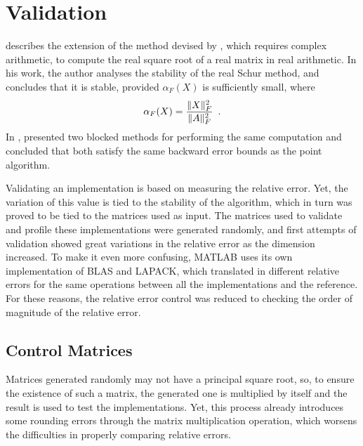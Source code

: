 \documentclass[../thesis]{subfiles}
\begin{document}
	\section{Validation}
	 describes the extension of the method devised by \citeauthor{bjorck:hammarling:1983}, which requires complex arithmetic, to compute the real square root of a real matrix in real arithmetic. In his work, the author analyses the stability of the real Schur method, and concludes that it is stable, provided $\alpha_F(X)$ is sufficiently small, where $$\alpha_F(X) = \frac{\lVert X\rVert_F^2}{\lVert A\rVert_F^2}\enspace.$$ In \cite{Deadman:Higham:Ralha:2013}, \citeauthor{Deadman:Higham:Ralha:2013} presented two blocked methods for performing the same computation and concluded that both satisfy the same backward error bounds as the point algorithm.

	Validating an implementation is based on measuring the relative error. Yet, the variation of this value is tied to the stability of the algorithm, which in turn was proved to be tied to the matrices used as input. The matrices used to validate and profile these implementations were generated randomly, and first attempts of validation showed great variations in the relative error as the dimension increased. To make it even more confusing, MATLAB uses its own implementation of BLAS and LAPACK, which translated in different relative errors for the same operations between all the implementations and the reference. For these reasons, the relative error control was reduced to checking the order of magnitude of the relative error.

		\subsection{Control Matrices}
		Matrices generated randomly may not have a principal square root, so, to ensure the existence of such a matrix, the generated one is multiplied by itself and the result is used to test the implementations. Yet, this process already introduces some rounding errors through the matrix multiplication operation, which worsens the difficulties in properly comparing relative errors.
\end{document}
